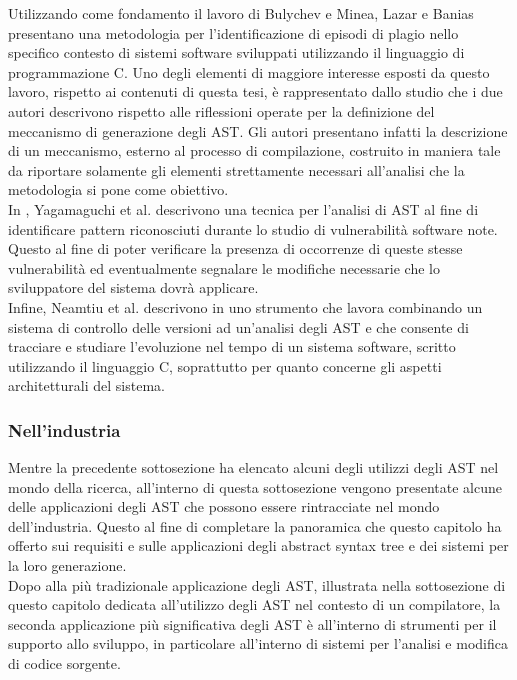 Utilizzando come fondamento il lavoro di Bulychev e Minea, Lazar e Banias
presentano una metodologia \cite{DBLP:conf/saci/LazarB14} per l’identificazione
di episodi di plagio nello specifico contesto di sistemi software sviluppati
utilizzando il linguaggio di programmazione C. Uno degli elementi di maggiore
interesse esposti da questo lavoro, rispetto ai contenuti di questa tesi, è
rappresentato dallo studio che i due autori descrivono rispetto alle riflessioni
operate per la definizione del meccanismo di generazione degli AST. Gli autori
presentano infatti la descrizione di un meccanismo, esterno al processo di
compilazione, costruito in maniera tale da riportare solamente gli elementi
strettamente necessari all’analisi che la metodologia si pone come obiettivo.\\

In \cite{DBLP:conf/acsac/YamaguchiLR12}, Yagamaguchi et al. descrivono una
tecnica per l’analisi di AST al fine di identificare pattern riconosciuti
durante lo studio di vulnerabilità software note. Questo al fine di poter
verificare la presenza di occorrenze di queste stesse vulnerabilità ed
eventualmente segnalare le modifiche necessarie che lo sviluppatore del sistema
dovrà applicare.\\

Infine, Neamtiu et al. descrivono in \cite{DBLP:journals/sigsoft/NeamtiuFH05}
uno strumento che lavora combinando un sistema di controllo delle versioni ad
un’analisi degli AST e che consente di tracciare e studiare l’evoluzione nel
tempo di un sistema software, scritto utilizzando il linguaggio C, soprattutto
per quanto concerne gli aspetti architetturali del sistema.

\subsubsection{Nell’industria}

Mentre la precedente sottosezione ha elencato alcuni degli utilizzi degli AST
nel mondo della ricerca, all’interno di questa sottosezione vengono presentate
alcune delle applicazioni degli AST che possono essere rintracciate nel mondo
dell’industria. Questo al fine di completare la panoramica che questo capitolo
ha offerto sui requisiti e sulle applicazioni degli abstract syntax tree e dei
sistemi per la loro generazione.\\

Dopo alla più tradizionale applicazione degli AST, illustrata nella sottosezione
di questo capitolo dedicata all’utilizzo degli AST nel contesto di un
compilatore, la seconda applicazione più significativa degli AST è all’interno
di strumenti per il supporto allo sviluppo, in particolare all’interno di
sistemi per l'analisi e modifica di codice sorgente.\\

